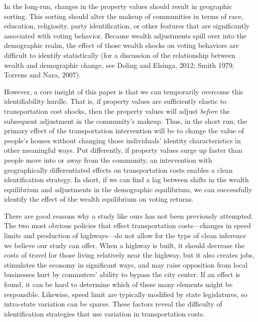 \documentclass[11.0pt]{article}
\theoremstyle{definition}
\begin{document}
In the long-run, changes in the property values should result in geographic sorting. This sorting should alter the makeup of communities in terms of race, education, religiosity, party identification, or other features that are significantly associated with voting behavior. Because wealth adjustments spill over into the demographic realm, the effect of those wealth shocks on voting behaviors are difficult to identify statistically (for a discussion of the relationship between wealth and demographic change, see Doling and Elsinga, 2012; Smith 1979; Torrens and Nara, 2007). 

However, a core insight of this paper is that we can temporarily overcome this identifiability hurdle. That is, if property values are sufficiently elastic to transportation cost shocks, then the property values will adjust \textit{before} the subsequent adjustment in the community's makeup. Thus, in the short run, the primary effect of the transportation intervention will be to change the value of people's houses without changing those individuals' identity characteristics in other meaningful ways. Put differently, if property values surge up faster than people move into or away from the community, an intervention with geographically differentiated effects on transportation costs enables a clean identification strategy. In short, if we can find a lag between shifts in the wealth equilibrium and adjustments in the demographic equilibrium, we can successfully identify the effect of the wealth equilibrium on voting returns.

There are good reasons why a study like ours has not been previously attempted. The two most obvious policies that effect transportation costs---changes in speed limits and production of highways---do not allow for the type of clean inference we believe our study can offer. When a highway is built, it should decrease the costs of travel for those living relatively near the highway, but it also creates jobs, stimulates the economy in significant ways, and may raise opposition from local businesses hurt by commuters' ability to bypass the city center. If an effect is found, it can be hard to determine which of these many elements might be responsible. Likewise, speed limit are typically modified by state legislatures, so intra-state variation can be sparse. These factors reveal the difficulty of identification strategies that use variation in transportation costs. 
\end{document}
